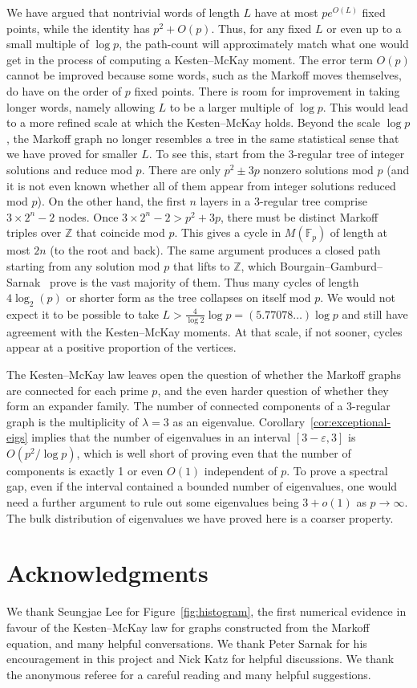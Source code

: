 \documentclass[AHL, Unicode, longabstracts, published]{cedram}
\newcommand{\Z}{\mathbb{Z}}
\newcommand{\F}{\mathbb{F}}
\newcommand{\Z}{\mathbb{Z}}
\begin{document}
We have argued that nontrivial words of length $L$ have at most $p e^{O(L)}$ fixed points, while the identity has $p^2 + O(p)$. Thus, for any fixed $L$ or even up to a small multiple of $\log{p}$, the path-count will approximately match what one would get in the process of computing a Kesten--McKay moment. The error term $O(p)$ cannot be improved because some words, such as the Markoff moves themselves, do have on the order of $p$ fixed points. There is room for improvement in taking longer words, namely allowing $L$ to be a larger multiple of $\log{p}$. This would lead to a more refined scale at which the Kesten--McKay holds. Beyond the scale $\log{p}$, the Markoff graph no longer resembles a tree in the same statistical sense that we have proved for smaller $L$. To see this, start from the 3-regular tree of integer solutions and reduce mod $p$. There are only $p^2 \pm 3p$ nonzero solutions mod $p$ (and it is not even known whether all of them appear from integer solutions reduced mod $p$). On the other hand, the first $n$ layers in a 3-regular tree comprise $3 \times 2^n - 2$ nodes. Once $3 \times 2^n - 2 > p^2+3p$, there must be distinct Markoff triples over $\Z$ that coincide mod $p$. This gives a cycle in $M(\F_p)$ of length at most $2n$ (to the root and back). The same argument produces a closed path starting from any solution mod $p$ that lifts to $\Z$, which Bourgain--Gamburd--Sarnak~\cite{BGS} prove is the vast majority of them. Thus many cycles of length $4\log_2(p)$ or shorter form as the tree collapses on itself mod $p$. We would not expect it to be possible to take $L > \frac{4}{\log{2}} \log{p} = (5.77078\ldots) \log{p}$ and still have agreement with the Kesten--McKay moments. At that scale, if not sooner, cycles appear at a positive proportion of the vertices.

The Kesten--McKay law leaves open the question of whether the Markoff graphs are connected for each prime $p$, and the even harder question of whether they form an expander family. The number of connected components of a 3-regular graph is the multiplicity of $\lambda=3$ as an eigenvalue. Corollary~\ref{cor:exceptional-eigs} implies that the number of eigenvalues in an interval $[3-\varepsilon,3]$ is $O(p^2/\log{p})$, which is well short of proving even that the number of components is exactly 1 or even $O(1)$ independent of $p$. To prove a spectral gap, even if the interval contained a bounded number of eigenvalues, one would need a further argument to rule out some eigenvalues being $3+o(1)$ as $p \rightarrow \infty$. The bulk distribution of eigenvalues we have proved here is a coarser property.

\section*{Acknowledgments}
We thank Seungjae Lee for Figure~\ref{fig:histogram}, the first numerical evidence in favour of the Kesten--McKay law for graphs constructed from the Markoff equation, and many helpful conversations. We thank Peter Sarnak for his encouragement in this project and Nick Katz for helpful discussions. We thank the anonymous referee for a careful reading and many helpful suggestions.




\end{document}
